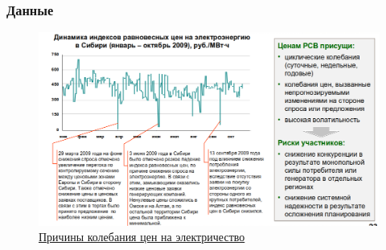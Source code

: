 \documentclass[c, dvipsnames]{beamer}  %
\begin{document}
\begin{frame}[shrink=5]
\frametitle{Данные} 



\begin{figure}
	\centering
	\includegraphics[width=0.7\linewidth]{screenshot001}
	\caption{\href{https://www.moex.com/ru/derivatives/commodity/power/}{Причины колебания цен на электричество}}
	\label{fig:screenshot001}
\end{figure}

\end{frame}
\end{document}
